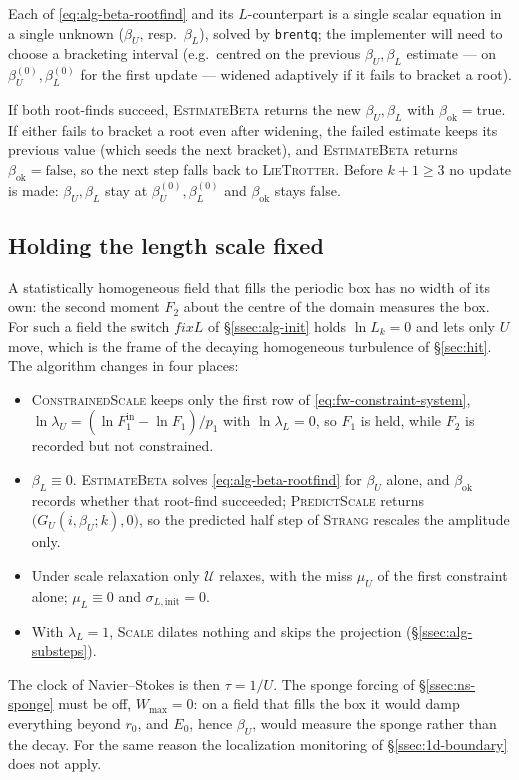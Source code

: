 \documentclass{article}
\begin{document}
Each of
\eqref{eq:alg-beta-rootfind} and its $L$-counterpart is a single scalar
equation in a single unknown ($\beta_U$, resp.\ $\beta_L$), solved by
\texttt{brentq}; the implementer will need to choose a bracketing interval
(e.g.\ centred on the previous $\beta_U, \beta_L$ estimate --- on
$\beta_U^{(0)}, \beta_L^{(0)}$ for the first update --- widened adaptively if
it fails to bracket a root).

If both root-finds succeed, \textsc{EstimateBeta} returns the new
$\beta_U, \beta_L$ with $\beta_{\mathrm{ok}} = \text{true}$. If either fails
to bracket a root even after widening, the failed estimate keeps its previous
value (which seeds the next bracket), and \textsc{EstimateBeta} returns
$\beta_{\mathrm{ok}} = \text{false}$, so the next step falls back to
\textsc{LieTrotter}. Before $k+1 \geq 3$ no update is made: $\beta_U, \beta_L$
stay at $\beta_U^{(0)}, \beta_L^{(0)}$ and $\beta_{\mathrm{ok}}$ stays false.

\subsection{Holding the length scale fixed}\label{ssec:alg-fixed-L}
A statistically homogeneous field that fills the periodic box has no width
of its own: the second moment $F_2$ about the centre of the domain measures
the box. For such a field the switch $\mathit{fixL}$ of
\S\ref{ssec:alg-init} holds $\ln L_k = 0$ and lets only $U$ move, which is
the frame of the decaying homogeneous turbulence of \S\ref{sec:hit}. The
algorithm changes in four places:
\begin{itemize}
  \item \textsc{ConstrainedScale} keeps only the first row of
  \eqref{eq:fw-constraint-system},
  $\ln \lambda_U = (\ln F_1^{\mathrm{in}} - \ln F_1)/p_1$ with
  $\ln \lambda_L = 0$, so $F_1$ is held, while $F_2$ is recorded but not
  constrained.
  \item $\beta_L \equiv 0$. \textsc{EstimateBeta} solves
  \eqref{eq:alg-beta-rootfind} for $\beta_U$ alone, and $\beta_{\mathrm{ok}}$
  records whether that root-find succeeded; \textsc{PredictScale} returns
  $\bigl(G_U(i, \beta_U; k), 0\bigr)$, so the predicted half step of
  \textsc{Strang} rescales the amplitude only.
  \item Under scale relaxation only $\mathcal{U}$ relaxes, with the miss
  $\mu_U$ of the first constraint alone; $\mu_L \equiv 0$ and
  $\sigma_{L,\mathrm{init}} = 0$.
  \item With $\lambda_L = 1$, \textsc{Scale} dilates nothing and skips the
  projection (\S\ref{ssec:alg-substeps}).
\end{itemize}
The clock of Navier--Stokes is then $\tau = 1/U$. The sponge forcing of
\S\ref{ssec:ns-sponge} must be off, $W_{\max} = 0$: on a field that fills the
box it would damp everything beyond $r_0$, and $E_0$, hence $\beta_U$, would
measure the sponge rather than the decay. For the same reason the
localization monitoring of \S\ref{ssec:1d-boundary} does not apply.
\end{document}

